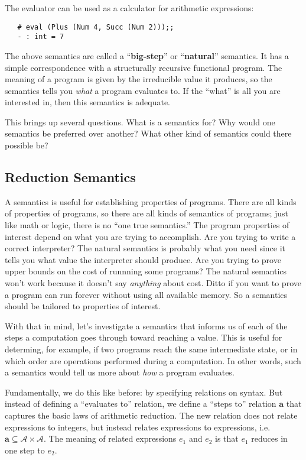 \documentclass[11pt]{article}
\newcommand{\deftech}[1]{\textbf{#1}}
\newcommand\areducename{\mathbf{a}}
\newcommand\Arith{\mathcal{A}}
\begin{document}
The evaluator can be used as a calculator for arithmetic expressions:
\begin{verbatim}
   # eval (Plus (Num 4, Succ (Num 2)));;
   - : int = 7
\end{verbatim}

The above semantics are called a ``\deftech{big-step}'' or ``\deftech{natural}''
semantics.  It has a simple correspondence with a structurally
recursive functional program.
The meaning of a program is given by the irreducible value it
produces, so the semantics tells you \emph{what} a program evaluates
to.  If the ``what'' is all you are interested in, then this semantics
is adequate.

This brings up several questions.  What is a semantics for?  Why would
one semantics be preferred over another?  What other kind of semantics
could there possible be?

\subsection{Reduction Semantics}

A semantics is useful for establishing properties of programs.  There
are all kinds of properties of programs, so there are all kinds of
semantics of programs; just like math or logic, there is no ``one true
semantics.''  The program properties of interest depend on what you
are trying to accomplish.  Are you trying to write a correct
interpreter?  The natural semantics is probably what you need since it
tells you what value the interpreter should produce.  Are you trying
to prove upper bounds on the cost of runnning some programs?  The
natural semantics won't work because it doesn't say \emph{anything}
about cost.  Ditto if you want to prove a program can run forever
without using all available memory.  So a semantics should be tailored
to properties of interest.

With that in mind, let's investigate a semantics that informs us of each
of the steps a computation goes through toward reaching a value.  This
is useful for determing, for example, if two programs reach the same
intermediate state, or in which order are operations performed during a
computation.  In other words, such a semantics would tell us more
about \emph{how} a program evaluates.

Fundamentally, we do this like before: by specifying relations on
syntax.  But instead of defining a ``evaluates to'' relation, we
define a ``steps to'' relation $\areducename$ that captures the basic
laws of arithmetic reduction.  The new relation does not relate
expressions to integers, but instead relates expressions to
expressions, i.e.~$\areducename \subseteq \Arith \times \Arith$.  The
meaning of related expressions $e_1$ and $e_2$ is that $e_1$ reduces
in one step to $e_2$.
\end{document}
